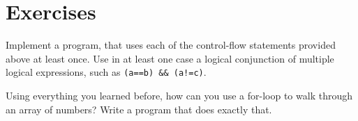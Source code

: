 \documentclass{dcbl/challenge}
\begin{document}
\section*{Exercises}
\begin{aufgabe}
    Implement a program, that uses each of the control-flow statements provided above at least once.
    Use in at least one case a logical conjunction of multiple logical expressions, such as \texttt{(a==b) \&\& (a!=c)}.
\end{aufgabe}

\begin{aufgabe}
    Using everything you learned before, how can you use a for-loop to walk through an array of numbers?
    Write a program that does exactly that.
\end{aufgabe}
\end{document}
